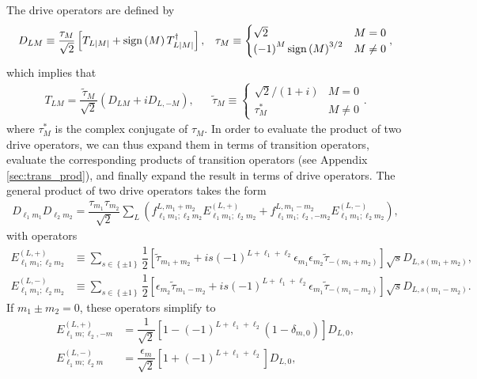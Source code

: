 \documentclass[nofootinbib,notitlepage,11pt]{revtex4-2}
\newcommand{\f}[2]{\dfrac{#1}{#2}} %
\newcommand{\p}[1]{\left(#1\right)} %
\renewcommand{\sp}[1]{\left[#1\right]} %
\renewcommand{\set}[1]{\left\{#1\right\}} %
\newcommand{\1}{\mathds{1}}
\DeclareMathOperator{\sign}{sign}
\begin{document}
The drive operators are defined by
\begin{align}
  D_{LM} \equiv \f{\tau_M}{\sqrt{2}}
  \sp{T_{L\abs{M}} + \sign\p{M}T_{L\abs{M}}^\dag},
  &&
  \tau_M \equiv
  \begin{cases}
    \sqrt{2} & M = 0 \\
    \p{-1}^M \sign\p{M}^{3/2} & M \ne 0
  \end{cases},
\end{align}
which implies that
\begin{align}
  T_{LM} = \f{\tilde\tau_M}{\sqrt{2}} \p{D_{LM} + i D_{L,-M}},
  &&
  \tilde\tau_M \equiv
  \begin{cases}
    \sqrt{2}/\p{1+i} & M = 0 \\
    \tau_M^* & M \ne 0
  \end{cases}.
\end{align}
where $\tau_M^*$ is the complex conjugate of $\tau_M$.  In order to
evaluate the product of two drive operators, we can thus expand them
in terms of transition operators, evaluate the corresponding products
of transition operators (see Appendix \ref{sec:trans_prod}), and
finally expand the result in terms of drive operators.  The general
product of two drive operators takes the form
\begin{align}
  D_{\ell_1 m_1} D_{\ell_2 m_2}
  = \f{\tau_{m_1}\tau_{m_2}}{\sqrt{2}}
  \sum_L \p{f_{\ell_1 m_1;\ell_2 m_2}^{L,m_1+m_2}
    E_{\ell_1 m_1;\ell_2 m_2}^{(L,+)}
    + f_{\ell_1 m_1;\ell_2,-m_2}^{L,m_1-m_2}
    E_{\ell_1 m_1;\ell_2 m_2}^{(L,-)}},
\end{align}
with operators
\begin{align}
  E_{\ell_1 m_1;\ell_2 m_2}^{(L,+)}
  &\equiv \sum_{s\in\set{\pm1}}
  \f12 \sp{\tilde\tau_{m_1+m_2}
    + i s \p{-1}^{L+\ell_1+\ell_2}
    \epsilon_{m_1} \epsilon_{m_2} \tilde\tau_{-\p{m_1+m_2}}}
  \sqrt{s} D_{L,s\p{m_1+m_2}},
  \\
  E_{\ell_1 m_1;\ell_2 m_2}^{(L,-)}
  &\equiv \sum_{s\in\set{\pm1}}
  \f12 \sp{\epsilon_{m_2} \tilde\tau_{m_1-m_2}
    + i s \p{-1}^{L+\ell_1+\ell_2}
    \epsilon_{m_1} \tilde\tau_{-\p{m_1-m_2}}}
  \sqrt{s} D_{L,s\p{m_1-m_2}}.
\end{align}
If $m_1\pm m_2=0$, these operators simplify to
\begin{align}
  E_{\ell_1 m;\ell_2,-m}^{(L,+)}
  &= \f1{\sqrt{2}} \sp{1 - \p{-1}^{L+\ell_1+\ell_2}
    \p{1-\delta_{m,0}}} D_{L,0}, \\
  E_{\ell_1 m;\ell_2 m}^{(L,-)}
  &= \f{\epsilon_m}{\sqrt{2}}
  \sp{1 + \p{-1}^{L+\ell_1+\ell_2}} D_{L,0},
\end{align}
\end{document}
